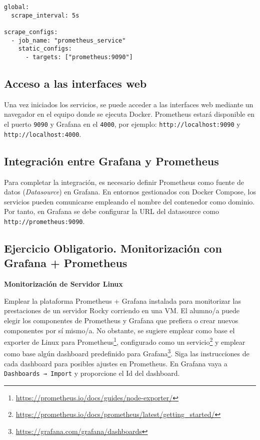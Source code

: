 \begin{verbatim}
global:
  scrape_interval: 5s

scrape_configs:
  - job_name: "prometheus_service"
    static_configs:
      - targets: ["prometheus:9090"]
\end{verbatim}

\subsection*{Acceso a las interfaces web}

Una vez iniciados los servicios, se puede acceder a las interfaces web mediante un navegador en el equipo donde se ejecuta Docker. Prometheus estará disponible en el puerto \texttt{9090} y Grafana en el \texttt{4000}, por ejemplo: \texttt{http://localhost:9090} y \texttt{http://localhost:4000}.

\subsection*{Integración entre Grafana y Prometheus}

Para completar la integración, es necesario definir Prometheus como fuente de datos (\textit{Datasource}) en Grafana. En entornos gestionados con Docker Compose, los servicios pueden comunicarse empleando el nombre del contenedor como dominio. Por tanto, en Grafana se debe configurar la URL del datasource como \texttt{http://prometheus:9090}.

\subsection{Ejercicio Obligatorio. Monitorización con Grafana + Prometheus}

\textbf{Monitorización de Servidor Linux}

Emplear la plataforma Prometheus + Grafana instalada para monitorizar las prestaciones de un servidor Rocky corriendo en una VM. El alumno/a puede elegir los componentes de Prometheus y Grafana que prefiera o crear nuevos componentes por sí mismo/a. No obstante, se sugiere emplear como base el exporter de Linux para Prometheus\footnote{\url{https://prometheus.io/docs/guides/node-exporter/}}, configurado como un servicio\footnote{\url{https://prometheus.io/docs/prometheus/latest/getting_started/}} y emplear como base algún dashboard predefinido para Grafana\footnote{\url{https://grafana.com/grafana/dashboards}}. Siga las instrucciones de cada dashboard para posibles ajustes en Prometheus. En Grafana vaya a \texttt{Dashboards → Import} y proporcione el Id del dashboard.

